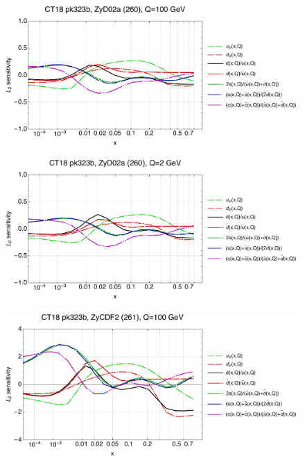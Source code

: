 \documentclass[10pt,aps,prd,floatfix,titlepage]{revtex4}
\begin{document}
\clearpage
\begin{figure}
\includegraphics[width=\textwidth,height=0.44\textheight,keepaspectratio]{2/260_ct18nn_q100_Sf_2.pdf}
\caption{}
\end{figure}
\begin{figure}
\includegraphics[width=\textwidth,height=0.44\textheight,keepaspectratio]{2/260_ct18nn_q2_Sf_2.pdf}
\caption{}
\end{figure}
\clearpage
\begin{figure}
\includegraphics[width=\textwidth,height=0.44\textheight,keepaspectratio]{2/261_ct18nn_q100_Sf_2.pdf}
\caption{}
\end{figure}
\end{document}

